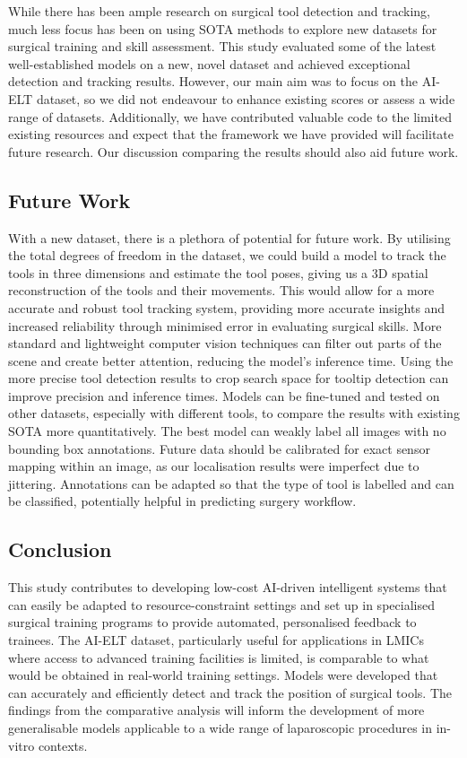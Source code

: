 While there has been ample research on surgical tool detection and tracking, much less focus has been on using SOTA methods to explore new datasets for surgical training and skill assessment. This study evaluated some of the latest well-established models on a new, novel dataset and achieved exceptional detection and tracking results. However, our main aim was to focus on the AI-ELT dataset, so we did not endeavour to enhance existing scores or assess a wide range of datasets. Additionally, we have contributed valuable code to the limited existing resources and expect that the framework we have provided will facilitate future research. Our discussion comparing the results should also aid future work.

\subsection{Future Work}

With a new dataset, there is a plethora of potential for future work. By utilising the total degrees of freedom in the dataset, we could build a model to track the tools in three dimensions and estimate the tool poses, giving us a 3D spatial reconstruction of the tools and their movements. This would allow for a more accurate and robust tool tracking system, providing more accurate insights and increased reliability through minimised error in evaluating surgical skills. More standard and lightweight computer vision techniques can filter out parts of the scene and create better attention, reducing the model's inference time. Using the more precise tool detection results to crop search space for tooltip detection can improve precision and inference times. Models can be fine-tuned and tested on other datasets, especially with different tools, to compare the results with existing SOTA more quantitatively. The best model can weakly label all images with no bounding box annotations. Future data should be calibrated for exact sensor mapping within an image, as our localisation results were imperfect due to jittering. Annotations can be adapted so that the type of tool is labelled and can be classified, potentially helpful in predicting surgery workflow.

\subsection{Conclusion}
 
This study contributes to developing low-cost AI-driven intelligent systems that can easily be adapted to resource-constraint settings and set up in specialised surgical training programs to provide automated, personalised feedback to trainees. The AI-ELT dataset, particularly useful for applications in LMICs where access to advanced training facilities is limited, is comparable to what would be obtained in real-world training settings. Models were developed that can accurately and efficiently detect and track the position of surgical tools. The findings from the comparative analysis will inform the development of more generalisable models applicable to a wide range of laparoscopic procedures in in-vitro contexts.

